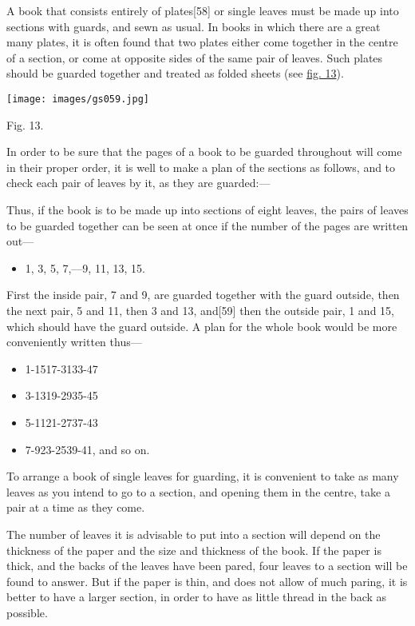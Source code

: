 \documentclass[
]{article}
\providecommand{\tightlist}{%
  \setlength{\itemsep}{0pt}\setlength{\parskip}{0pt}}
\begin{document}
A book that consists entirely of
plates{\protect\hypertarget{Page_58}{}{{[}58{]}}} or single leaves must
be made up into sections with guards, and sewn as usual. In books in
which there are a great many plates, it is often found that two plates
either come together in the centre of a section, or come at opposite
sides of the same pair of leaves. Such plates should be guarded together
and treated as folded sheets (see \protect\hyperlink{Fig_13}{fig. 13}).

\protect\hypertarget{Fig_13}{}{}
\texttt{[image: images/gs059.jpg]}

Fig. 13.

In order to be sure that the pages of a book to be guarded throughout
will come in their proper order, it is well to make a plan of the
sections as follows, and to check each pair of leaves by it, as they are
guarded:---

Thus, if the book is to be made up into sections of eight leaves, the
pairs of leaves to be guarded together can be seen at once if the number
of the pages are written out---

\begin{itemize}
\tightlist
\item
  1, 3, 5, 7,---9, 11, 13, 15.
\end{itemize}

First the inside pair, 7 and 9, are guarded together with the guard
outside, then the next pair, 5 and 11, then 3 and 13,
and{\protect\hypertarget{Page_59}{}{{[}59{]}}} then the outside pair, 1
and 15, which should have the guard outside. A plan for the whole book
would be more conveniently written thus---

\begin{itemize}
\tightlist
\item
  1-15{17-31}{33-47}
\item
  3-13{19-29}{35-45}
\item
  5-11{21-27}{37-43}
\item
  7-9{23-25}{39-41, and so on.}
\end{itemize}

To arrange a book of single leaves for guarding, it is convenient to
take as many leaves as you intend to go to a section, and opening them
in the centre, take a pair at a time as they come.

The number of leaves it is advisable to put into a section will depend
on the thickness of the paper and the size and thickness of the book. If
the paper is thick, and the backs of the leaves have been pared, four
leaves to a section will be found to answer. But if the paper is thin,
and does not allow of much paring, it is better to have a larger
section, in order to have as little thread in the back as possible.
\end{document}
